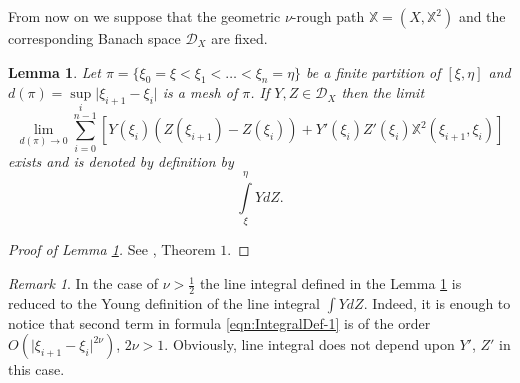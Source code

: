 \documentclass[11pt,a4paper,leqno]{amsart}%
\theoremstyle{plain}
\theoremstyle{remark}
\newtheorem{remark}[theorem]{Remark}
\theoremstyle{plain}
\newtheorem{lemma}[theorem]{Lemma}
\numberwithin{equation}{section}
\def\liml{\lim\limits}
\def\supl{\sup\limits}
\def\intl{\int\limits}
\def\supl{\mathop{\sup}\limits}
\begin{document}
From now on we suppose that the geometric $\nu$-rough path
$\mathbb{X}=(X,\mathbb{X}^2)$ and the corresponding Banach space
$\mathcal{D}_X$ are fixed.
\begin{lemma}\label{lem:IntegralDef}
Let $\pi=\{\xi_0=\xi<\xi_1<\ldots<\xi_n=\eta\}$ be a finite
partition of $[\xi,\eta]$ and $d(\pi)=\supl_i\vert \xi_{i+1}-\xi_i\vert $ is
a mesh of $\pi$. If $Y,Z\in \mathcal{D}_X$ then the limit
\begin{equation}
\liml_{d(\pi)\to
0}\sum_{i=0}^{n-1}[Y(\xi_i)(Z(\xi_{i+1})-Z(\xi_i))+Y'(\xi_i)Z'(\xi_i)\mathbb{X}^2(\xi_{i+1},\xi_i)]\label{eqn:IntegralDef-1}
\end{equation}
exists and is denoted by definition by
$$
\intl_{\xi}^{\eta}YdZ.
$$
\end{lemma}
\begin{proof}[ Proof of Lemma \ref{lem:IntegralDef}]
See \cite{[Gubinelli-2004]}, Theorem $1$.
\end{proof}
\begin{remark}\label{rem:SmoothCase}
In the case of $\nu>\frac{1}{2}$ the line integral defined in the
Lemma \ref{lem:IntegralDef} is reduced to the Young definition of the
line integral $\int YdZ$. Indeed, it is enough to notice that
second term in formula \eqref{eqn:IntegralDef-1} is of the order
$O(\vert \xi_{i+1}-\xi_i\vert^{2\nu})$, $2\nu>1$. Obviously, line integral
does not depend upon $Y'$, $Z'$ in this case.
\end{remark}
\end{document}
